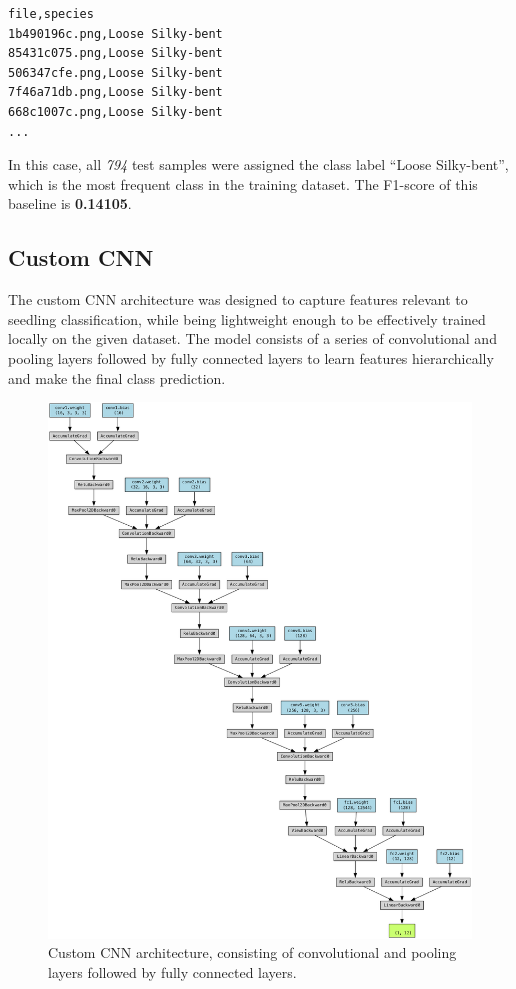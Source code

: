 \begin{minipage}{0.9\linewidth}\begin{lstlisting}[language={},caption={Head of guessing baseline submission file.},label={lst:guessing-baseline}]
file,species
1b490196c.png,Loose Silky-bent
85431c075.png,Loose Silky-bent
506347cfe.png,Loose Silky-bent
7f46a71db.png,Loose Silky-bent
668c1007c.png,Loose Silky-bent
...
\end{lstlisting}\end{minipage}

In this case, all \textit{794} test samples were assigned the class label ``Loose Silky-bent'', which is the most frequent class in the training dataset. The F1-score of this baseline is \textbf{0.14105}.

\subsection{Custom CNN}

The custom CNN architecture was designed to capture features relevant to seedling classification, while being lightweight enough to be effectively trained locally on the given dataset. The model consists of a series of convolutional and pooling layers followed by fully connected layers to learn features hierarchically and make the final class prediction.

\begin{figure}[htbp]
    \centerline{\includegraphics[width=0.9\linewidth]{../../resources/custom_cnn/architecture.png}}
    \caption{Custom CNN architecture, consisting of convolutional and pooling layers followed by fully connected layers.}
    \label{fig:custom-cnn-architecture}
\end{figure}

